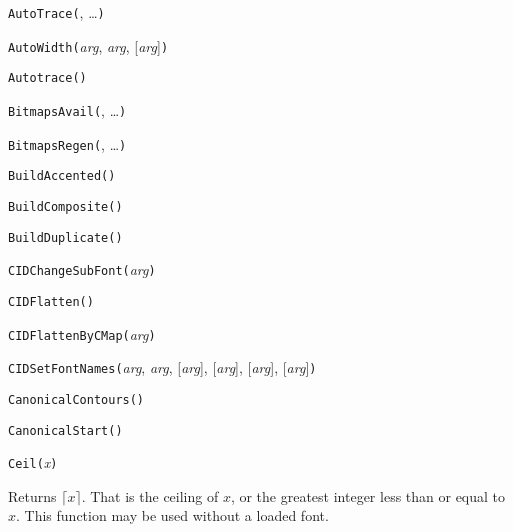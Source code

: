 
\noindent\texttt{AutoTrace(}, \ldots\texttt{)}


\noindent\texttt{AutoWidth(}\textit{arg}, \textit{arg}, [\textit{arg}]\texttt{)}


\noindent\texttt{Autotrace(}\texttt{)}


\noindent\texttt{BitmapsAvail(}, \ldots\texttt{)}


\noindent\texttt{BitmapsRegen(}, \ldots\texttt{)}


\noindent\texttt{BuildAccented(}\texttt{)}


\noindent\texttt{BuildComposite(}\texttt{)}


\noindent\texttt{BuildDuplicate(}\texttt{)}


\noindent\texttt{CIDChangeSubFont(}\textit{arg}\texttt{)}


\noindent\texttt{CIDFlatten(}\texttt{)}


\noindent\texttt{CIDFlattenByCMap(}\textit{arg}\texttt{)}


\noindent\texttt{CIDSetFontNames(}\textit{arg}, \textit{arg}, [\textit{arg}], [\textit{arg}], [\textit{arg}], [\textit{arg}]\texttt{)}


\noindent\texttt{CanonicalContours(}\texttt{)}


\noindent\texttt{CanonicalStart(}\texttt{)}


\noindent\texttt{Ceil(}\textit{x}\texttt{)}

Returns $\lceil x \rceil$.  That is the ceiling of $x$, or the greatest
integer less than or equal to $x$.  This function may be used without a
loaded font.


